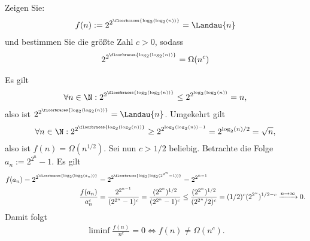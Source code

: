 
\begin{exercise}

Zeigen Sie:
\begin{align*}
  f(n) := 2^{2^{\floorbraces{\log_2(\log_2(n))}}} = \Landau{n}
\end{align*}
und bestimmen Sie die größte Zahl $c > 0$, sodass
\begin{align*}
  2^{2^{\floorbraces{\log_2(\log_2(n))}}} = \Omega(n^c)
\end{align*}

\end{exercise}


\begin{solution}

Es gilt
\begin{align*}
  \forall n \in \N: 2^{2^{\floorbraces{\log_2(\log_2(n))}}} \leq 2^{2^{\log_2(\log_2(n))}} = n,
\end{align*}
also ist $2^{2^{\floorbraces{\log_2(\log_2(n))}}} = \Landau{n}$. Umgekehrt gilt
\begin{align*}
  \forall n \in \N: 2^{2^{\floorbraces{\log_2(\log_2(n))}}} \geq 2^{2^{\log_2(\log_2(n)) - 1}}
  = 2^{\log_2(n)/2} = \sqrt{n},
\end{align*}
also ist $f(n) = \Omega(n^{1/2})$. Sei nun $c > 1/2$ beliebig.
Betrachte die Folge $a_n := 2^{2^n} - 1$. Es gilt
\begin{align*}
  f(a_n) = 2^{2^{\floorbraces{\log_2(\log_2(a_n))}}} &= 2^{2^{\floorbraces{\log_2(\log_2(2^{2^n} - 1))}}}
  = 2^{2^{n-1}} \\
  \frac{f(a_n)}{a_n^c} &= \frac{2^{2^{n-1}}}{(2^{2^n} - 1)^c}
  = \frac{(2^{2^n})^{1/2}}{(2^{2^n} - 1)^c} \leq \frac{(2^{2^n})^{1/2}}{(2^{2^n}/2)^c}
  = (1/2)^c(2^{2^n})^{1/2 - c} \xrightarrow{n \to \infty} 0.
\end{align*}
Damit folgt
\begin{align*}
  \liminf \frac{f(n)}{n^c} = 0 \iff f(n) \neq \Omega(n^c).
\end{align*}
\end{solution}

